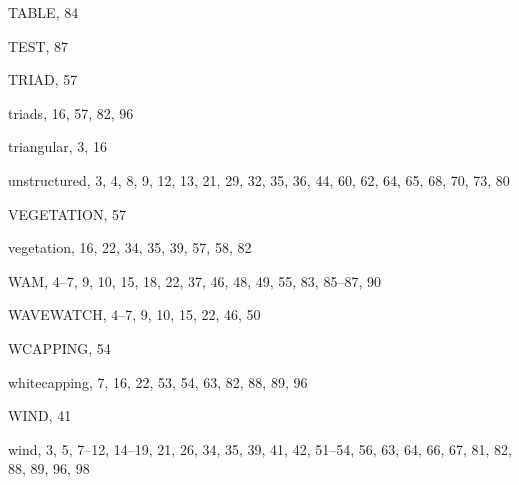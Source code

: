 \documentclass[12pt]{book}
\begin{document}
\begin{theindex}
  \indexspace

  \item TABLE, 84
  \item TEST, 87
  \item TRIAD, 57
  \item triads, 16, 57, 82, 96
  \item triangular, 3, 16

  \indexspace

  \item unstructured, 3, 4, 8, 9, 12, 13, 21, 29, 32, 35, 36, 44, 60,
		62, 64, 65, 68, 70, 73, 80

  \indexspace

  \item VEGETATION, 57
  \item vegetation, 16, 22, 34, 35, 39, 57, 58, 82

  \indexspace

  \item WAM, 4--7, 9, 10, 15, 18, 22, 37, 46, 48, 49, 55, 83, 85--87,
		90
  \item WAVEWATCH, 4--7, 9, 10, 15, 22, 46, 50
  \item WCAPPING, 54
  \item whitecapping, 7, 16, 22, 53, 54, 63, 82, 88, 89, 96
  \item WIND, 41
  \item wind, 3, 5, 7--12, 14--19, 21, 26, 34, 35, 39, 41, 42, 51--54,
		56, 63, 64, 66, 67, 81, 82, 88, 89, 96, 98

\end{theindex}
\end{document}
